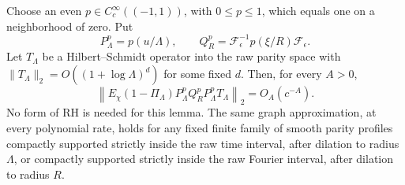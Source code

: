 \begin{lemma}
Choose an even \(p\in C_c^\infty((-1,1))\), with \(0\leq p\leq1\),
which equals one on a neighborhood of zero.  Put
\[
 P_\Lambda^p=p(u/\Lambda),\qquad
 Q_R^p=\mathcal F_\epsilon^{-1}p(\xi/R)\mathcal F_\epsilon.
 \tag{TU.1}
\]
Let \(T_\Lambda\) be a Hilbert--Schmidt operator into the raw
parity space with
\(\|T_\Lambda\|_2=O((1+\log\Lambda)^d)\) for some fixed \(d\).
Then, for every \(A>0\),
\[
 \left\|E_\chi(1-\Pi_\Lambda)
             P_\Lambda^pQ_R^pP_\Lambda^pT_\Lambda\right\|_2
                    =O_A(c^{-A}).
 \tag{TU.2}
\]
No form of RH is needed for this lemma.
The same graph approximation, at every polynomial rate, holds
for any fixed finite family of smooth parity profiles compactly
supported strictly inside the raw time interval, after dilation
to radius \(\Lambda\), or compactly supported strictly inside
the raw Fourier interval, after dilation to radius \(R\).
\end{lemma}

